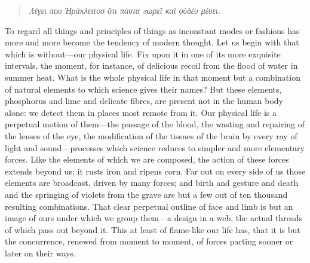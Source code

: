 





\begin{quote}
\emph{Λέγει που Ἡράκλειτοσ ὅτι πἀυτα xωρεῖ καὶ ούδέυ μέυει.}
\end{quote}

To regard all things and principles of things as inconstant modes or
fashions has more and more become the tendency of modern thought. Let us
begin with that which is without---our physical life. Fix upon it in one
of its more exquisite intervals, the moment, for instance, of delicious
recoil from the flood of water in summer heat. What is the whole
physical life in that moment but a combination of natural elements to
which science gives their names? But these elements, phosphorus and lime
and delicate fibres, are present not in the human body alone: we detect
them in places most remote from it. Our physical life is a perpetual
motion of them---the passage of the blood, the wasting and repairing of
the lenses of the eye, the modification of the tissues of the brain by
every ray of light and sound---processes which science reduces to
simpler and more elementary forces. Like the elements of which we are
composed, the action of these forces extends beyond us; it rusts iron
and ripens corn. Far out on every side of us those elements are
broadcast, driven by many forces; and birth and gesture and death and
the springing of violets from the grave are but a few out of ten
thousand resulting combinations. That clear perpetual outline of face
and limb is but an image of ours under which we group them---a design in
a web, the actual threads of which pass out beyond it. This at least of
flame-like our life has, that it is but the concurrence, renewed from
moment to moment, of forces parting sooner or later on their ways.

